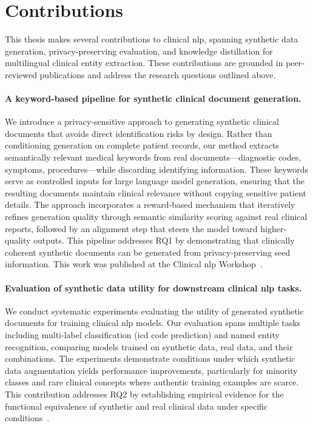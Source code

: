 \section{Contributions}

This thesis makes several contributions to clinical \gls{nlp}, spanning synthetic data generation, privacy-preserving evaluation, and knowledge distillation for multilingual clinical entity extraction. These contributions are grounded in peer-reviewed publications and address the research questions outlined above.

\paragraph{A keyword-based pipeline for synthetic clinical document generation.} We introduce a privacy-sensitive approach to generating synthetic clinical documents that avoids direct identification risks by design. Rather than conditioning generation on complete patient records, our method extracts semantically relevant medical keywords from real documents---diagnostic codes, symptoms, procedures---while discarding identifying information. These keywords serve as controlled inputs for large language model generation, ensuring that the resulting documents maintain clinical relevance without copying sensitive patient details. The approach incorporates a reward-based mechanism that iteratively refines generation quality through semantic similarity scoring against real clinical reports, followed by an alignment step that steers the model toward higher-quality outputs. This pipeline addresses RQ1 by demonstrating that clinically coherent synthetic documents can be generated from privacy-preserving seed information. This work was published at the Clinical \gls{nlp} Workshop~\citep{meoni2024generating, meoni2025synthetic}.

\paragraph{Evaluation of synthetic data utility for downstream clinical \gls{nlp} tasks.} We conduct systematic experiments evaluating the utility of generated synthetic documents for training clinical \gls{nlp} models. Our evaluation spans multiple tasks including multi-label classification (\gls{icd} code prediction) and named entity recognition, comparing models trained on synthetic data, real data, and their combinations. The experiments demonstrate conditions under which synthetic data augmentation yields performance improvements, particularly for minority classes and rare clinical concepts where authentic training examples are scarce. This contribution addresses RQ2 by establishing empirical evidence for the functional equivalence of synthetic and real clinical data under specific conditions~\citep{meoni2025synthetic}.

